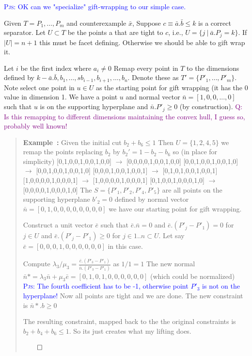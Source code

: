 \documentclass{article}
\newcounter{excount}
\newenvironment{example}{\begin{quote}\refstepcounter{excount}\textbf{Example~\arabic{excount}:}}{\hfill$\qed$\end{quote}}
\newcommand{\question}[1]{\textcolor{purple}{\textsc{Q:} #1}}
\newcommand{\pjs}[1]{\textcolor{blue}{\textsc{Pjs:} #1}}
\begin{document}
\pjs{OK can we "specialize" gift-wrapping to our simple case.}

Given $T = {P_1, \ldots, P_m}$ and counterexample $\bar{x}$,
Suppose $c \equiv \bar{a}. \bar{b} \leq k$ is a correct separator. 
Let $U \subset T$ be the points a that are tight to $c$,
i.e., $U = \{ j ~|~ \bar{a}. P_j = k\}$. If $|U| = n+1$ this must be facet defining. Otherwise we  should be able to gift wrap it.

Let $i$ be the first index where $a_i \neq 0$
Remap every point in $T$ to the dimensions defined by
$k - \bar{a}.\bar{b}, b_1, \ldots,s b_{i-1}, b_{i+1}, \ldots, b_n$.
Denote these as $T' = \{P'_1, \ldots, P'_m\}$.
Note select one point in $u \in U$ as the starting point for gift wrapping (it has the 0 value in dimension 1. We have a point
$u$ and normal vector $\bar{n} = [1,0,0, ..., 0]$ such that $u$ is on the supporting hyperplane and $\bar{n}.P'_j \geq 0$ (by construction).
\question{Is this remapping to different dimensions maintaining the convex hull, I guess so, probably well known!}
\begin{example}
Given the initial cut $b_2 + b_6 \leq 1$ 
Then $U = \{1,2,4,5\}$ 
we remap the points replacing $b_2$ by $b_2' = 1 - b_2 - b_6$ so
(in place for simplicity)
[0,1,0,0,1,0,0,1,0,0] $\rightarrow$ [0,0,0,0,1,0,0,1,0,0]
[0,0,1,0,0,1,0,0,1,0] $\rightarrow$ [0,0,1,0,0,1,0,0,1,0]
[0,0,0,1,0,0,1,0,0,1] $\rightarrow$ [0,1,0,1,0,0,1,0,0,1]
[1,0,0,0,0,1,0,0,0,1] $\rightarrow$ [1,0,0,0,0,1,0,0,0,1]
[0,1,0,0,1,0,0,0,1,0] $\rightarrow$ [0,0,0,0,1,0,0,0,1,0]
The $S = \{P'_1, P'_2, P'_4, P'_5\}$ are all points on the supporting hyperplane $b'_2 = 0$ defined by normal vector $\bar{n} = [0,1,0,0,0,0,0,0,0,0]$ 
we have our starting point for gift wrapping. 

Construct a unit vector $\bar{e}$ such that $\bar{e}.\bar{n} = 0$
and $\bar{e}. (P'_j-P'_1) = 0$ for $j \in U$
and $\bar{e}. (P'_j-P'_1) \geq 0$ for $j \in 1..n \subset U$.
Let say $\bar{e} = [0,0,0,1,0,0,0,0,0,0]$ in this case.

Compute $\lambda_3 / \mu_3 = \frac{ \bar{e}.(P'_3-P'_1)}{\bar{n}.(P'_3 - P'_1)}$ as $1/1 = 1$
The new normal $\bar{n}* = \lambda_3 \bar{n} + \mu_3 \bar{e} = [0,1,0,1,0,0,0,0,0,0]$ (which could be normalized)
\pjs{The fourth coefficient has to be -1, otherwise point $P'_3$ is not on the hyperplane!}
Now all points are tight and we are done. 
The new constraint is $\bar{n}*.b \geq 0$

The resulting constraint, mapped back to the the original constraints is 
$b_2 + b_4 + b_6 \leq 1$.
So its just creates what my lifting does.



\end{example}
\end{document}
